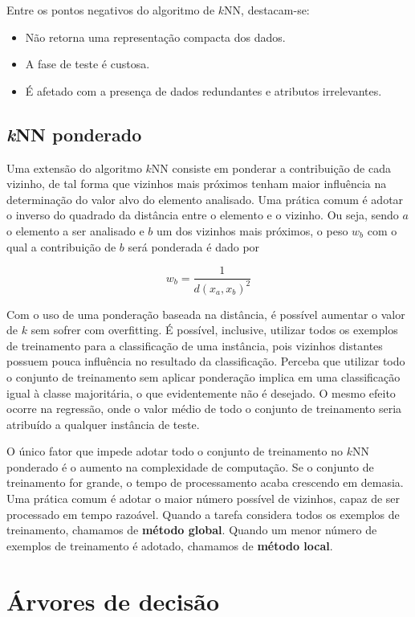 \insertspace

Entre os pontos negativos do algoritmo de $k$NN, destacam-se:
\begin{itemize}
	\item Não retorna uma representação compacta dos dados.
	\item A fase de teste é custosa.
	\item É afetado com a presença de dados redundantes e atributos irrelevantes.
\end{itemize}

\subsection{\textit{k}NN ponderado}

Uma extensão do algoritmo $k$NN consiste em ponderar a contribuição de cada vizinho, de tal forma que vizinhos mais próximos tenham maior influência na determinação do valor alvo do elemento analisado. Uma prática comum é adotar o inverso do quadrado da distância entre o elemento e o vizinho. Ou seja, sendo $a$ o elemento a ser analisado e $b$ um dos vizinhos mais próximos, o peso $w_b$ com o qual a contribuição de $b$ será ponderada é dado por

$$
w_b = \frac{1}{d(x_a, x_b)^2}
$$

Com o uso de uma ponderação baseada na distância, é possível aumentar o valor de $k$ sem sofrer com overfitting. É possível, inclusive, utilizar todos os exemplos de treinamento para a classificação de uma instância, pois vizinhos distantes possuem pouca influência no resultado da classificação. Perceba que utilizar todo o conjunto de treinamento sem aplicar ponderação implica em uma classificação igual à classe majoritária, o que evidentemente não é desejado. O mesmo efeito ocorre na regressão, onde o valor médio de todo o conjunto de treinamento seria atribuído a qualquer instância de teste.

O único fator que impede adotar todo o conjunto de treinamento no $k$NN ponderado é o aumento na complexidade de computação. Se o conjunto de treinamento for grande, o tempo de processamento acaba crescendo em demasia. Uma prática comum é adotar o maior número possível de vizinhos, capaz de ser processado em tempo razoável. Quando a tarefa considera todos os exemplos de treinamento, chamamos de \textbf{método global}. Quando um menor número de exemplos de treinamento é adotado, chamamos de \textbf{método local}.

\section{Árvores de decisão}

